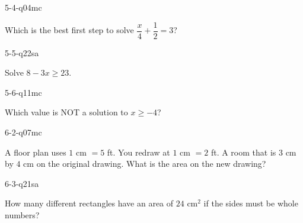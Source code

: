 \begin{practiceQuestion}{5-4-q04}{mc}
\begin{questionText}
Which is the best first step to solve $\dfrac{x}{4} + \dfrac{1}{2} = 3$?
\end{questionText}
\end{practiceQuestion}

\begin{practiceQuestion}{5-5-q22}{sa}
\begin{questionText}
Solve $8 - 3x \geq 23$.
\end{questionText}
\end{practiceQuestion}

\begin{practiceQuestion}{5-6-q11}{mc}
\begin{questionText}
Which value is NOT a solution to $x \geq -4$?
\end{questionText}
\end{practiceQuestion}

\begin{practiceQuestion}{6-2-q07}{mc}
\begin{questionText}
A floor plan uses $1$ cm $= 5$ ft. You redraw at $1$ cm $= 2$ ft. A room that is $3$ cm by $4$ cm on the original drawing. What is the area on the new drawing?
\end{questionText}
\end{practiceQuestion}

\begin{practiceQuestion}{6-3-q21}{sa}
\begin{questionText}
How many different rectangles have an area of $24$ cm$^2$ if the sides must be whole numbers?
\end{questionText}
\end{practiceQuestion}

